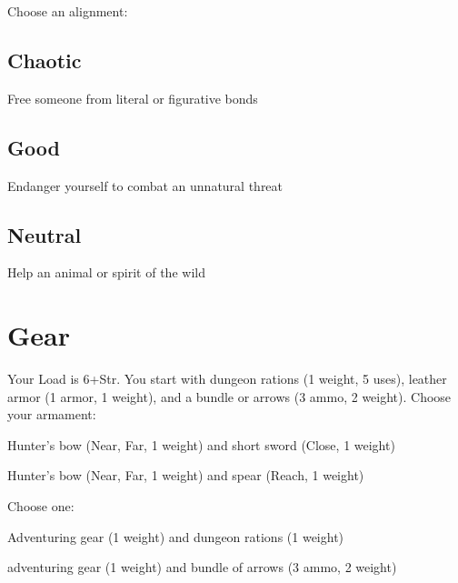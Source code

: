 \startInstructionsAfterHeader
Choose an alignment:
\stopInstructionsAfterHeader
 


\subsection{Chaotic}   
 

Free someone from literal or figurative bonds

 
\subsection{Good}   
 

Endanger yourself to combat an unnatural threat

 
\subsection{Neutral}   
 

Help an animal or spirit of the wild



 
\section{Gear}   
 



Your Load is 6+Str. You start with dungeon rations (1 weight, 5 uses), leather armor (1 armor, 1 weight), and a bundle or arrows (3 ammo, 2 weight). Choose your armament:

 
\startitemize[1,packed]

\item Hunter's bow (Near, Far, 1 weight) and short sword (Close, 1 weight)

 
\item Hunter's bow (Near, Far, 1 weight) and spear (Reach, 1 weight)


\stopitemize
 

Choose one:

 
\startitemize[1,packed]

\item Adventuring gear (1 weight) and dungeon rations (1 weight)

 
\item adventuring gear (1 weight) and bundle of arrows (3 ammo, 2 weight)


\stopitemize


